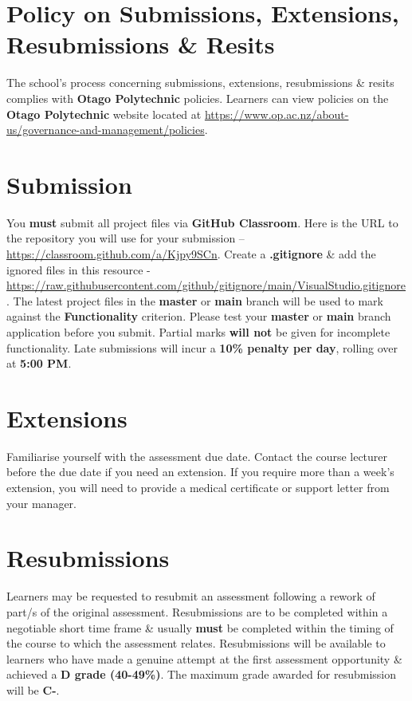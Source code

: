 \documentclass{article}
\begin{document}
\section*{Policy on Submissions, Extensions, Resubmissions \& Resits}
The school's process concerning submissions, extensions, resubmissions \& resits complies with \textbf{Otago Polytechnic} policies. Learners can view policies on the \textbf{Otago Polytechnic} website located at \href{https://www.op.ac.nz/about-us/governance-and-management/policies}{https://www.op.ac.nz/about-us/governance-and-management/policies}.

\section*{Submission}
You \textbf{must} submit all project files via \textbf{GitHub Classroom}. Here is the URL to the repository you will use for your submission – \href{https://classroom.github.com/a/Kjpy9SCn}{https://classroom.github.com/a/Kjpy9SCn}.  Create a \textbf{.gitignore} \& add the ignored files in this resource - \href{https://raw.githubusercontent.com/github/gitignore/main/VisualStudio.gitignore}{https://raw.githubusercontent.com/github/gitignore/main/VisualStudio.gitignore}. The latest project files in the \textbf{master} or \textbf{main} branch will be used to mark against the \textbf{Functionality} criterion. Please test your \textbf{master} or \textbf{main} branch application before you submit. Partial marks \textbf{will not} be given for incomplete functionality. Late submissions will incur a \textbf{10\% penalty per day}, rolling over at \textbf{5:00 PM}.

\section*{Extensions}
Familiarise yourself with the assessment due date. Contact the course lecturer before the due date if you need an extension. If you require more than a week's extension, you will need to provide a medical certificate or support letter from your manager.

\section*{Resubmissions}
Learners may be requested to resubmit an assessment following a rework of part/s of the original assessment. Resubmissions are to be completed within a negotiable short time frame \& usually \textbf{must} be completed within the timing of the course to which the assessment relates. Resubmissions will be available to learners who have made a genuine attempt at the first assessment opportunity \& achieved a \textbf{D grade (40-49\%)}. The maximum grade awarded for resubmission will be \textbf{C-}.
\end{document}
